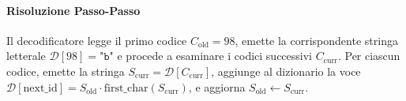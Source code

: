 \paragraph{Risoluzione Passo-Passo}
Il decodificatore legge il primo codice $C_{\text{old}} = 98$, emette la corrispondente stringa letterale $\mathcal{D}[98] = \texttt{"b"}$ e procede a esaminare i codici successivi $C_{\text{curr}}$. Per ciascun codice, emette la stringa $S_{\text{curr}} = \mathcal{D}[C_{\text{curr}}]$, aggiunge al dizionario la voce $\mathcal{D}[\text{next\_id}] = S_{\text{old}} \cdot \text{first\_char}(S_{\text{curr}})$, e aggiorna $S_{\text{old}} \leftarrow S_{\text{curr}}$.

\begin{table}[H]
\centering
\small
\caption{Tracciamento dettagliato della decodifica LZW e ricostruzione del dizionario.}
\label{tab:tracciamento-lzw-uncompress}
\end{table}

